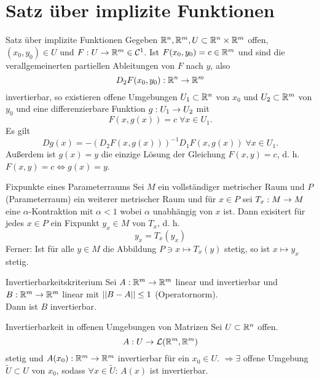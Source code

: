 \documentclass[main.tex]{subfiles}
\begin{document}
\section*{Satz über implizite Funktionen}

\begin{karte}{Satz über implizite Funktionen}
    Gegeben \( \mathbb{R}^n, \mathbb{R}^m, U \subset \mathbb{R}^n \times \mathbb{R}^m \) 
    offen, \( (x_0,y_0)\in U \) und \( F : U \rightarrow \mathbb{R}^m \in \mathcal{C}^1 \). 
    Ist \( F(x_0, y_0) = c\in \mathbb{R}^m \) und sind die verallgemeinerten partiellen 
    Ableitungen von \( F \) nach \( y \), also 
    \[ D_2 F(x_0, y_0) : \mathbb{R}^n \rightarrow \mathbb{R}^m \] 
    invertierbar, so existieren offene Umgebungen \( U_1 \subset \mathbb{R}^n \) 
    von \(x_0\) und \( U_2 \subset \mathbb{R}^m \) von \(y_0\) und eine 
    differenzierbare Funktion \( g : U_1 \rightarrow U_2 \) mit 
    \[ F(x, g(x)) = c \;\forall x\in U_1. \]
    Es gilt 
    \[ Dg(x) = -(D_2 F(x,g(x)))^{-1} D_1 F(x,g(x)) \;\forall x\in U_1. \]
    Außerdem ist \( g(x) = y \) die einzige Lösung der Gleichung 
    \( F(x,y) = c \), d. h. \( F(x,y) = c \Leftrightarrow g(x) = y \).
\end{karte}

\begin{karte}{Fixpunkte eines Parameterraums}
    Sei \( M \) ein vollständiger metrischer Raum und \( P \) 
    (Parameterraum) ein weiterer metrischer Raum und für \( x\in P \)     
    sei \(T_x : M \rightarrow M\) eine \(\alpha\)-Kontraktion mit \(\alpha < 1\)
    wobei \(\alpha\) unabhängig von \(x\) ist. Dann exisitert für jedes \(x \in P\)
    ein Fixpunkt \(y_x \in M\) von \(T_x\), d. h. 
    \[ y_x = T_x(y_x) \]
    Ferner: Ist für alle \(y \in M\) die Abbildung 
    \(P \ni x \mapsto T_x(y)\) stetig, so ist
    \( x \mapsto y_x \) stetig.
\end{karte}

\begin{karte}{Invertierbarkeitskriterium}
    Sei \( A : \mathbb{R}^m \rightarrow \mathbb{R}^m \) linear und 
    invertierbar und \( B : \mathbb{R}^m \rightarrow \mathbb{R}^m \) 
    linear mit \(\left|\left|B-A\right|\right| \leq 1\) (Operatornorm). \\
    Dann ist \( B \) invertierbar.
\end{karte}

\begin{karte}{Invertierbarkeit in offenen Umgebungen von Matrizen}
    Sei \( U \subset \mathbb{R}^n \) offen. 
    \[ A : U \rightarrow \mathcal{L}(\mathbb{R}^m, \mathbb{R}^m) \]
    stetig und \( A(x_0) : \mathbb{R}^m \rightarrow \mathbb{R}^m \) invertierbar 
    für ein \( x_0 \in U \). \( \Rightarrow \exists \) offene Umgebung 
    \( \tilde{U} \subset U \) von \( x_0 \), sodass \( \forall x \in \tilde{U} \): 
    \( A(x) \) ist invertierbar.
\end{karte}
\end{document}
